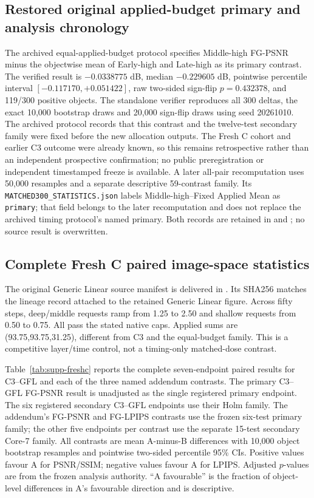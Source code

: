 \documentclass[11pt]{article}
\begin{document}
\subsection*{Restored original applied-budget primary and analysis chronology}
The archived equal-applied-budget protocol specifies Middle-high FG-PSNR minus the objectwise mean of Early-high and Late-high as its primary contrast. The verified result is $-0.0338775$ dB, median $-0.229605$ dB, pointwise percentile interval $[-0.117170,+0.051422]$, raw two-sided sign-flip $p=0.432378$, and 119/300 positive objects. The standalone verifier reproduces all 300 deltas, the exact 10,000 bootstrap draws and 20,000 sign-flip draws using seed 20261010. The archived protocol records that this contrast and the twelve-test secondary family were fixed before the new allocation outputs. The Fresh C cohort and earlier C3 outcome were already known, so this remains retrospective rather than an independent prospective confirmation; no public preregistration or independent timestamped freeze is available. A later all-pair recomputation uses 50,000 resamples and a separate descriptive 59-contrast family. Its \texttt{MATCHED300\_STATISTICS.json} labels Middle-high--Fixed Applied Mean as \texttt{primary}; that field belongs to the later recomputation and does not replace the archived timing protocol's named primary. Both records are retained in  and ; no source result is overwritten.

\subsection*{Complete Fresh C paired image-space statistics}
The original Generic Linear source manifest is delivered in . Its SHA256 matches the lineage record attached to the retained Generic Linear figure. Across fifty steps, deep/middle requests ramp from 1.25 to 2.50 and shallow requests from 0.50 to 0.75. All pass the stated native caps. Applied sums are (93.75,93.75,31.25), different from C3 and the equal-budget family. This is a competitive layer/time control, not a timing-only matched-dose contrast.

Table~\ref{tab:supp-freshc} reports the complete seven-endpoint paired results for C3--GFL and each of the three named addendum contrasts. The primary C3--GFL FG-PSNR result is unadjusted as the single registered primary endpoint. The six registered secondary C3--GFL endpoints use their Holm family. The addendum's FG-PSNR and FG-LPIPS contrasts use the frozen six-test primary family; the other five endpoints per contrast use the separate 15-test secondary Core-7 family. All contrasts are mean A-minus-B differences with 10,000 object bootstrap resamples and pointwise two-sided percentile 95\% CIs. Positive values favour A for PSNR/SSIM; negative values favour A for LPIPS. Adjusted $p$-values are from the frozen analysis authority. “A favourable” is the fraction of object-level differences in A's favourable direction and is descriptive.
\end{document}
